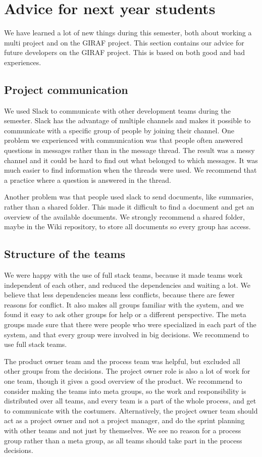 \section{Advice for next year students}

We have learned a lot of new things during this semester, both about working a multi project and on the GIRAF project. This section contains our advice for future developers on the GIRAF project. This is based on both good and bad experiences. 

\subsection{Project communication}
We used Slack to communicate with other development teams during the semester. Slack has the advantage of multiple channels and makes it possible to communicate with a specific group of people by joining their channel. One problem we experienced with communication was that people often answered questions in messages rather than in the message thread. The result was a messy channel and it could be hard to find out what belonged to which messages. It was much easier to find information when the threads were used. We recommend that a practice where a question is answered in the thread. 

Another problem was that people used slack to send documents, like summaries, rather than a shared folder. This made it difficult to find a document and get an overview of the available documents. We strongly recommend a shared folder, maybe in the Wiki repository, to store all documents so every group has access. 

\subsection{Structure of the teams}
We were happy with the use of full stack teams, because it made teams work independent of each other, and reduced the dependencies and waiting a lot. We believe that less dependencies means less conflicts, because there are fewer reasons for conflict. It also makes all groups familiar with the system, and we found it easy to ask other groups for help or a different perspective. The meta groups made sure that there were people who were specialized in each part of the system, and that every group were involved in big decisions. We recommend to use full stack teams. 

The product owner team and the process team was helpful, but excluded all other groups from the decisions. The project owner role is also a lot of work for one team, though it gives a good overview of the product. We recommend to consider making the teams into meta groups, so the work and responsibility is distributed over all teams, and every team is a part of the whole process, and get to communicate with the costumers. Alternatively, the project owner team should act as a project owner and not a project manager, and do the sprint planning with other teams and not just by themselves. We see no reason for a process group rather than a meta group, as all teams should take part in the process decisions. 

